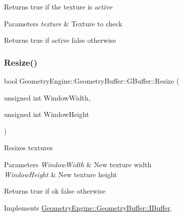 Returns true if the texture is active 
\begin{DoxyParams}{Parameters}
{\em texture} & Texture to check \\
\hline
\end{DoxyParams}
\begin{DoxyReturn}{Returns}
true if active false otherwise 
\end{DoxyReturn}
\mbox{\label{class_geometry_engine_1_1_geometry_buffer_1_1_g_buffer_a487fb4fb346b34e5fa4a994e97211bab}} 
\subsubsection{\texorpdfstring{Resize()}{Resize()}}
{\footnotesize\ttfamily bool Geometry\+Engine\+::\+Geometry\+Buffer\+::\+G\+Buffer\+::\+Resize (\begin{DoxyParamCaption}\item[{unsigned int}]{Window\+Width,  }\item[{unsigned int}]{Window\+Height }\end{DoxyParamCaption})\hspace{0.3cm}{\ttfamily [virtual]}}

Resizes textures 
\begin{DoxyParams}{Parameters}
{\em Window\+Width} & New texture width \\
\hline
{\em Window\+Height} & New texture height \\
\hline
\end{DoxyParams}
\begin{DoxyReturn}{Returns}
true if ok false otherwise 
\end{DoxyReturn}


Implements \mbox{\hyperlink{class_geometry_engine_1_1_geometry_buffer_1_1_i_buffer_a3b764e340ccb06bee072d1bd95b007df}{Geometry\+Engine\+::\+Geometry\+Buffer\+::\+I\+Buffer}}.

\mbox{\label{class_geometry_engine_1_1_geometry_buffer_1_1_g_buffer_a3034ecd5b07b64a0cb7af24f5c6f80ae}} 
